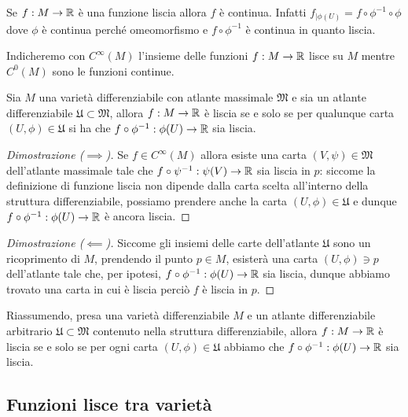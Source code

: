 \begin{remark}
	Se $ f : M \to \mathbb{R} $ è una funzione liscia allora $ f $ è continua. Infatti $ f_{|\phi(U)} = f \circ \phi^{-1} \circ \phi $ dove $ \phi $ è continua perché omeomorfismo e $ f \circ \phi^{-1} $ è continua in quanto liscia.
\end{remark}

Indicheremo con $ C^{\infty}(M) $ l'insieme delle funzioni $ f : M \to \mathbb{R} $ lisce su $ M $ mentre $ C^{0}(M) $ sono le funzioni continue.

\begin{definition}
	Sia $ M $ una varietà differenziabile con atlante massimale $ \mathfrak{M} $ e sia un atlante differenziabile $ \mathfrak{U} \subset \mathfrak{M} $, allora $ f : M \to \mathbb{R} $ è liscia se e solo se per qualunque carta $ (U,\phi) \in \mathfrak{U} $ si ha che $ f \circ \phi^{-1} : \phi(U) \to \mathbb{R} $ sia liscia.
\end{definition}

\begin{proof}[Dimostrazione ($ \implies $)]
	Se $ f \in C^{\infty}(M) $ allora esiste una carta $ (V,\psi) \in \mathfrak{M} $ dell'atlante massimale tale che $ f \circ \psi^{-1} : \psi(V) \to \mathbb{R} $ sia liscia in $ p $: siccome la definizione di funzione liscia non dipende dalla carta scelta all'interno della struttura differenziabile, possiamo prendere anche la carta $ (U,\phi) \in \mathfrak{U} $ e dunque $ f \circ \phi^{-1} : \phi(U) \to \mathbb{R} $ è ancora liscia.
\end{proof}

\begin{proof}[Dimostrazione ($ \impliedby $)]
	Siccome gli insiemi delle carte dell'atlante $ \mathfrak{U} $ sono un ricoprimento di $ M $, prendendo il punto $ p \in M $, esisterà una carta $ (U,\phi) \ni p $ dell'atlante tale che, per ipotesi, $ f \circ \phi^{-1} : \phi(U) \to \mathbb{R} $ sia liscia, dunque abbiamo trovato una carta in cui è liscia perciò $ f $ è liscia in $ p $.
\end{proof}

Riassumendo, presa una varietà differenziabile $ M $ e un atlante differenziabile arbitrario $ \mathfrak{U} \subset \mathfrak{M} $ contenuto nella struttura differenziabile, allora $ f : M \to \mathbb{R} $ è liscia se e solo se per ogni carta $ (U,\phi) \in \mathfrak{U} $ abbiamo che $ f \circ \phi^{-1} : \phi(U) \to \mathbb{R} $ sia liscia.

\subsection{Funzioni lisce tra varietà}

